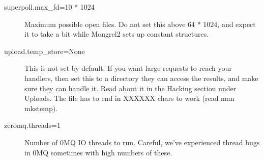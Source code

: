 \begin{description}
\item[superpoll.max\_fd=10 * 1024] Maximum possible open files.  Do not set this above 64 * 1024, and expect it to take a bit while Mongrel2 sets up constant structures.
\item[upload.temp\_store=None] This is not set by default.  If you want large requests to reach your handlers, then set this to a directory they can access the results, and make sure they can handle it.  Read about it in the Hacking section under Uploads.  The file has to end in XXXXXX chars to work (read man mkstemp).
\item[zeromq.threads=1] Number of 0MQ IO threads to run.  Careful, we've experienced thread bugs in 0MQ sometimes with high numbers of these.
\end{description}


